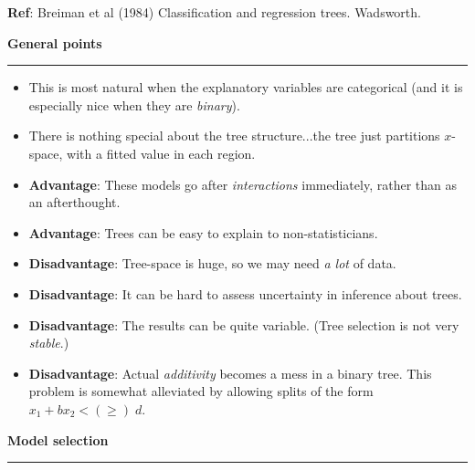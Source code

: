 \documentclass[12pt,letterpaper]{article}
\newcommand{\HRule}{\rule{\linewidth}{4pt}}
\newcommand{\vsphalf}{\vspace*{0.5cm}}
\begin{document}
\vsphalf

\textbf{Ref}: Breiman et al (1984) Classification and regression
trees.  Wadsworth.


\newpage

\fontsize{30}{30} \selectfont

\centerline{\textbf{General points}}

\HRule

\vsphalf

\fontsize{20}{25} \selectfont

\begin{itemize}

\item This is most natural when the explanatory variables are
  categorical (and it is especially nice when they are \emph{binary}).

\item There is nothing special about the tree structure...the tree
  just partitions $x$-space, with a fitted value in each region.

\item \textbf{Advantage}: These models go after
  \emph{interactions\/} immediately, rather than as an afterthought.  

\item \textbf{Advantage}: Trees can be easy to explain to
  non-statisticians. 
  
\item \textbf{Disadvantage}: Tree-space is huge, so we may need
  \emph{a lot\/} of data.
  
\item \textbf{Disadvantage}: It can be hard to assess uncertainty in
  inference about trees.

\item \textbf{Disadvantage}: The results can be quite variable.  (Tree
  selection is not very \emph{stable}.)

\item \textbf{Disadvantage}: Actual \emph{additivity\/} becomes a mess
  in a binary tree.  This problem is somewhat alleviated by allowing
  splits of the form $x_1 + b x_2 < (\ge) \; d$.

\end{itemize}




\newpage

\fontsize{30}{30} \selectfont

\centerline{\textbf{Model selection}}

\HRule
\end{document}

